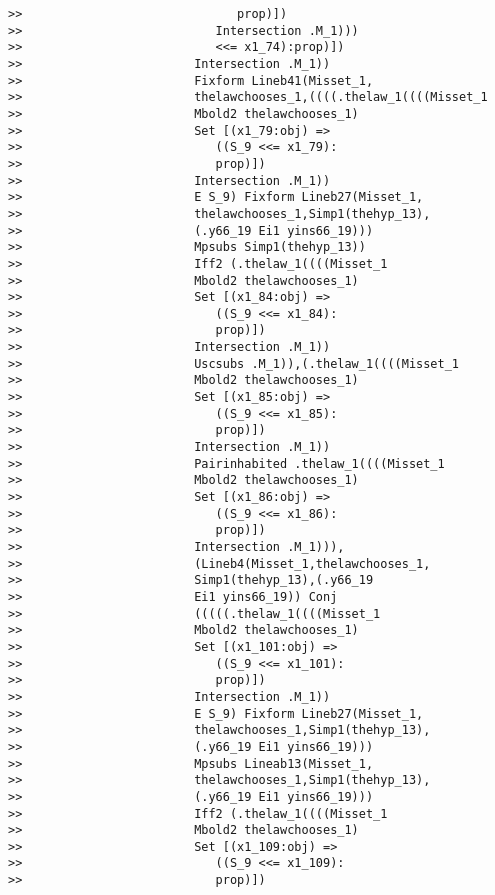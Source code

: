 \documentclass[12pt]{article}
\begin{document}
\begin{verbatim}
>>                              prop)])
>>                           Intersection .M_1)))
>>                           <<= x1_74):prop)])
>>                        Intersection .M_1))
>>                        Fixform Lineb41(Misset_1,
>>                        thelawchooses_1,((((.thelaw_1((((Misset_1
>>                        Mbold2 thelawchooses_1)
>>                        Set [(x1_79:obj) =>
>>                           ((S_9 <<= x1_79):
>>                           prop)])
>>                        Intersection .M_1))
>>                        E S_9) Fixform Lineb27(Misset_1,
>>                        thelawchooses_1,Simp1(thehyp_13),
>>                        (.y66_19 Ei1 yins66_19)))
>>                        Mpsubs Simp1(thehyp_13))
>>                        Iff2 (.thelaw_1((((Misset_1
>>                        Mbold2 thelawchooses_1)
>>                        Set [(x1_84:obj) =>
>>                           ((S_9 <<= x1_84):
>>                           prop)])
>>                        Intersection .M_1))
>>                        Uscsubs .M_1)),(.thelaw_1((((Misset_1
>>                        Mbold2 thelawchooses_1)
>>                        Set [(x1_85:obj) =>
>>                           ((S_9 <<= x1_85):
>>                           prop)])
>>                        Intersection .M_1))
>>                        Pairinhabited .thelaw_1((((Misset_1
>>                        Mbold2 thelawchooses_1)
>>                        Set [(x1_86:obj) =>
>>                           ((S_9 <<= x1_86):
>>                           prop)])
>>                        Intersection .M_1))),
>>                        (Lineb4(Misset_1,thelawchooses_1,
>>                        Simp1(thehyp_13),(.y66_19
>>                        Ei1 yins66_19)) Conj
>>                        (((((.thelaw_1((((Misset_1
>>                        Mbold2 thelawchooses_1)
>>                        Set [(x1_101:obj) =>
>>                           ((S_9 <<= x1_101):
>>                           prop)])
>>                        Intersection .M_1))
>>                        E S_9) Fixform Lineb27(Misset_1,
>>                        thelawchooses_1,Simp1(thehyp_13),
>>                        (.y66_19 Ei1 yins66_19)))
>>                        Mpsubs Lineab13(Misset_1,
>>                        thelawchooses_1,Simp1(thehyp_13),
>>                        (.y66_19 Ei1 yins66_19)))
>>                        Iff2 (.thelaw_1((((Misset_1
>>                        Mbold2 thelawchooses_1)
>>                        Set [(x1_109:obj) =>
>>                           ((S_9 <<= x1_109):
>>                           prop)])

\end{verbatim}
\end{document}

